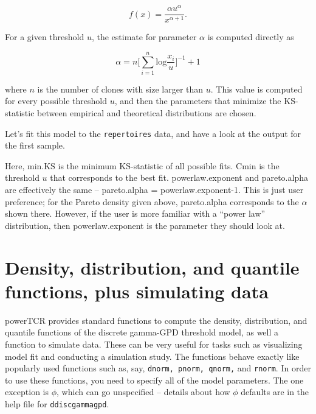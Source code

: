 \documentclass[]{article}
\newcommand{\hlnum}[1]{\textcolor[rgb]{0.816,0.125,0.439}{#1}}%
\newcommand{\hlstr}[1]{\textcolor[rgb]{0.251,0.627,0.251}{#1}}%
\newcommand{\hlstd}[1]{\textcolor[rgb]{0.251,0.251,0.251}{#1}}%
\newcommand{\hlkwd}[1]{\textcolor[rgb]{0.878,0.439,0.125}{#1}}%
\newenvironment{Shaded}{\begin{myshaded}}{\end{myshaded}}
\newcommand{\KeywordTok}[1]{\hlkwd{#1}}
\newcommand{\DecValTok}[1]{\hlnum{#1}}
\newcommand{\StringTok}[1]{\hlstr{#1}}
\newcommand{\NormalTok}[1]{\hlstd{#1}}
\theoremstyle{definition}
\theoremstyle{definition}
\theoremstyle{definition}
\theoremstyle{remark}
\begin{document}
\[
f(x) = \frac{\alpha u^\alpha}{x^{\alpha+1}}.
\]

For a given threshold \(u\), the estimate for parameter \(\alpha\) is
computed directly as

\[
\alpha=n\bigg[\sum_{i=1}^n\text{log}\frac{x_i}{u}\bigg]^{-1}+1
\]

where \(n\) is the number of clones with size larger than \(u\). This
value is computed for every possible threshold \(u\), and then the
parameters that minimize the KS-statistic between empirical and
theoretical distributions are chosen.

Let's fit this model to the \texttt{repertoires} data, and have a look
at the output for the first sample.

\begin{Shaded}
\end{Shaded}

Here, min.KS is the minimum KS-statistic of all possible fits. Cmin is
the threshold \(u\) that corresponds to the best fit. powerlaw.exponent
and pareto.alpha are effectively the same -- pareto.alpha =
powerlaw.exponent-1. This is just user preference; for the Pareto
density given above, pareto.alpha corresponds to the \(\alpha\) shown
there. However, if the user is more familiar with a ``power law''
distribution, then powerlaw.exponent is the parameter they should look
at.

\section{Density, distribution, and quantile functions, plus simulating
data}\label{density-distribution-and-quantile-functions-plus-simulating-data}

powerTCR provides standard functions to compute the density,
distribution, and quantile functions of the discrete gamma-GPD threshold
model, as well a function to simulate data. These can be very useful for
tasks such as visualizing model fit and conducting a simulation study.
The functions behave exactly like popularly used functions such as, say,
\texttt{dnorm, pnorm, qnorm,} and \texttt{rnorm}. In order to use these
functions, you need to specify all of the model parameters. The one
exception is \(\phi\), which can go unspecified -- details about how
\(\phi\) defaults are in the help file for \texttt{ddiscgammagpd}.
\end{document}

